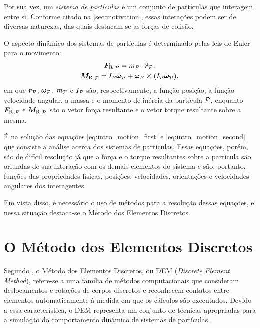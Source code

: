 Por sua vez, um \textit{sistema de partículas} é um conjunto de partículas que interagem entre si. Conforme citado na \autoref{sec:motivation}, essas interações podem ser de diversas naturezas, das quais destacam-se as forças de colisão.

O aspecto dinâmico dos sistemas de partículas é determinado pelas leis de Euler para o movimento:
\begin{gather}
	{\resultingForce}_{,\particle} = \mass_{\particle}\cdot\acceleration_{\particle}, \label{eq:intro_motion_first}\\
	{\resultingTorque}_{,\particle} = \momentOfInertia_{\particle}\deriv{1}{\angularVelocity}_{\particle} + \angularVelocity_{\particle}\cross\pqty{\momentOfInertia_{\particle}\angularVelocity_{\particle}}, \label{eq:intro_motion_second}
\end{gather}
em que \(\bm{r}_{\mathcal{P}}\), \(\bm{\omega}_{\mathcal{P}}\), \(m_{\mathcal{P}}\) e \(I_{\mathcal{P}}\) são, respectivamente, a função posição, a função velocidade angular, a massa e o momento de inércia da partícula \(\mathcal{P}\), enquanto \({\bm{F}_{\text{R}}}_{,\mathcal{P}}\) e \({\bm{M}_{\text{R}}}_{,\mathcal{P}}\) são o vetor força resultante e o vetor torque resultante sobre a mesma.

É na solução das equações \eqref{eq:intro_motion_first} e \eqref{eq:intro_motion_second} que consiste a análise acerca dos sistemas de partículas. Essas equações, porém, são de difícil resolução já que a força e o torque resultantes sobre a partícula são oriundas de sua interação com os demais elementos do sistema e são, portanto, funções das propriedades físicas, posições, velocidades, orientações e velocidades angulares dos interagentes.

Em vista disso, é necessário o uso de métodos para a resolução dessas equações, e nessa situação destaca-se o Método dos Elementos Discretos.

\section{O Método dos Elementos Discretos} 

Segundo , o Método dos Elementos Discretos, ou DEM (\textit{Discrete Element Method}), refere-se a uma família de métodos computacionais que consideram deslocamentos e rotações de corpos discretos e reconhecem contatos entre elementos automaticamente à medida em que os cálculos são executados. Devido a essa característica, o DEM representa um conjunto de técnicas apropriadas para a simulação do comportamento dinâmico de sistemas de partículas.

